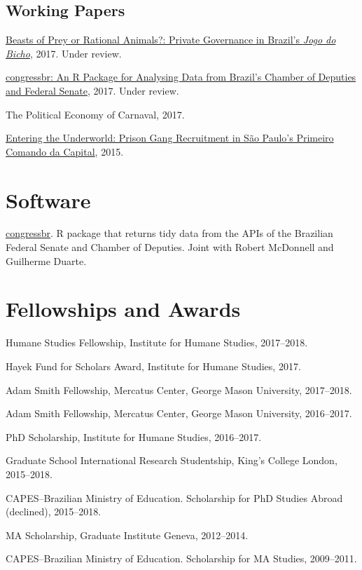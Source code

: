 \documentclass[letterpaper]{article}
\renewenvironment{itemize}{
  \begin{list}{}{
    \setlength{\leftmargin}{1.5em}
  }
}{
  \end{list}
}
\begin{document}
\subsection*{Working Papers}

\begin{itemize}
	\item \href{https://osf.io/se2jr}{Beasts of Prey or Rational Animals?: Private Governance in Brazil's \emph{Jogo do Bicho}}, 2017. Under review.
	\item \href{https://osf.io/n5jd8}{congressbr: An R Package for Analysing Data from Brazil's Chamber of Deputies and Federal Senate}, 2017. Under review.
	\item The Political Economy of Carnaval, 2017.
	\item \href{http://danilofreire.com/articles/entering.pdf}{Entering the Underworld: Prison Gang Recruitment in S\~{a}o Paulo's Primeiro Comando da Capital}, 2015.
\end{itemize}

\section*{Software}

\begin{itemize}
	\item \href{https://cran.r-project.org/web/packages/congressbr}{congressbr}. R package that returns tidy data from the APIs of the Brazilian Federal Senate and Chamber of Deputies. Joint with Robert McDonnell and Guilherme Duarte.
\end{itemize}

\section*{Fellowships and Awards}

\begin{itemize}
	\item Humane Studies Fellowship, Institute for Humane Studies, 2017--2018.
	\item Hayek Fund for Scholars Award, Institute for Humane Studies, 2017.
	\item Adam Smith Fellowship, Mercatus Center, George Mason University, 2017--2018.
	\item Adam Smith Fellowship, Mercatus Center, George Mason University, 2016--2017.
	\item PhD Scholarship, Institute for Humane Studies, 2016--2017.
	\item Graduate School International Research Studentship, King's College London, 2015--2018.
	\item CAPES--Brazilian Ministry of Education. Scholarship for PhD Studies Abroad (declined), 2015--2018.
	\item MA Scholarship, Graduate Institute Geneva, 2012--2014.
	\item CAPES--Brazilian Ministry of Education. Scholarship for MA Studies, 2009--2011.
\end{itemize}
\end{document}
